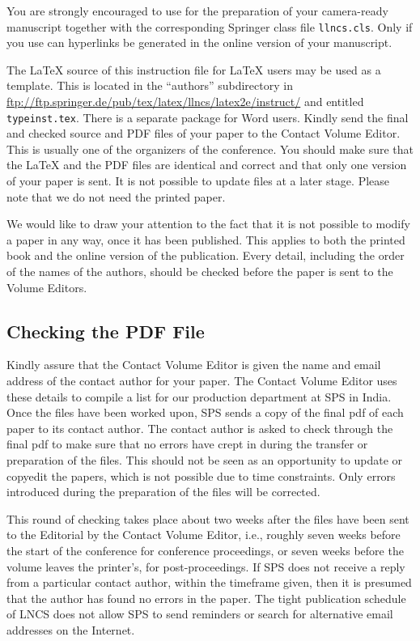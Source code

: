 \documentclass[runningheads,a4paper]{llncs}
\begin{document}
You are strongly encouraged to use \LaTeXe{} for the
preparation of your camera-ready manuscript together with the
corresponding Springer class file \verb+llncs.cls+. Only if you use
\LaTeXe{} can hyperlinks be generated in the online version
of your manuscript.

The \LaTeX{} source of this instruction file for \LaTeX{} users may be
used as a template. This is
located in the ``authors'' subdirectory in
\url{ftp://ftp.springer.de/pub/tex/latex/llncs/latex2e/instruct/} and
entitled \texttt{typeinst.tex}. There is a separate package for Word
users. Kindly send the final and checked source
and PDF files of your paper to the Contact Volume Editor. This is
usually one of the organizers of the conference. You should make sure
that the \LaTeX{} and the PDF files are identical and correct and that
only one version of your paper is sent. It is not possible to update
files at a later stage. Please note that we do not need the printed
paper.

We would like to draw your attention to the fact that it is not possible
to modify a paper in any way, once it has been published. This applies
to both the printed book and the online version of the publication.
Every detail, including the order of the names of the authors, should
be checked before the paper is sent to the Volume Editors.

\subsection{Checking the PDF File}

Kindly assure that the Contact Volume Editor is given the name and email
address of the contact author for your paper. The Contact Volume Editor
uses these details to compile a list for our production department at
SPS in India. Once the files have been worked upon, SPS sends a copy of
the final pdf of each paper to its contact author. The contact author is
asked to check through the final pdf to make sure that no errors have
crept in during the transfer or preparation of the files. This should
not be seen as an opportunity to update or copyedit the papers, which is
not possible due to time constraints. Only errors introduced during the
preparation of the files will be corrected.

This round of checking takes place about two weeks after the files have
been sent to the Editorial by the Contact Volume Editor, i.e., roughly
seven weeks before the start of the conference for conference
proceedings, or seven weeks before the volume leaves the printer's, for
post-proceedings. If SPS does not receive a reply from a particular
contact author, within the timeframe given, then it is presumed that the
author has found no errors in the paper. The tight publication schedule
of LNCS does not allow SPS to send reminders or search for alternative
email addresses on the Internet.
\end{document}
